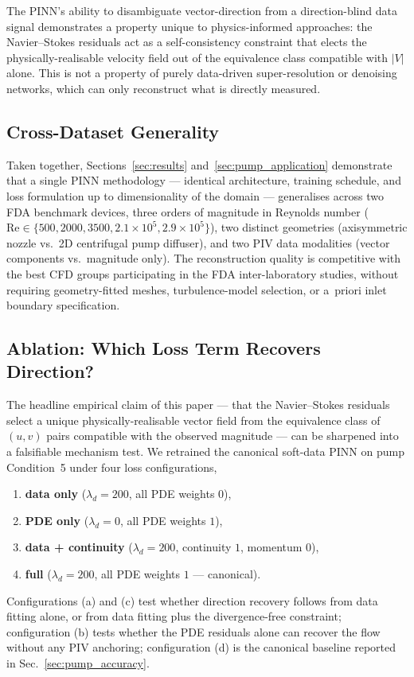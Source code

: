 \documentclass[12pt,a4paper]{article}
\newcommand{\Reyn}{\mathrm{Re}}    %
\begin{document}
The PINN's ability to disambiguate vector-direction from a
direction-blind data signal demonstrates a property unique to
physics-informed approaches: the Navier--Stokes residuals act
as a self-consistency constraint that elects the
physically-realisable velocity field out of the equivalence
class compatible with $|V|$ alone. This is not a property of
purely data-driven super-resolution or denoising networks,
which can only reconstruct what is directly measured.

\subsection{Cross-Dataset Generality}
\label{sec:pump_generality}

Taken together, Sections~\ref{sec:results}
and~\ref{sec:pump_application} demonstrate that a single PINN
methodology --- identical architecture, training schedule,
and loss formulation up to dimensionality of the domain ---
generalises across two FDA benchmark devices, three orders of
magnitude in Reynolds number ($\Reyn \in
\{500, 2000, 3500, 2.1 \times 10^5, 2.9 \times 10^5\}$), two
distinct geometries (axisymmetric nozzle vs.\ 2D centrifugal
pump diffuser), and two PIV data modalities (vector
components vs.\ magnitude only). The reconstruction quality
is competitive with the best CFD groups participating in the
FDA inter-laboratory studies, without requiring
geometry-fitted meshes, turbulence-model selection, or
a~priori inlet boundary specification.

\subsection{Ablation: Which Loss Term Recovers Direction?}
\label{sec:ablation_results}

The headline empirical claim of this paper --- that the
Navier--Stokes residuals select a unique physically-realisable
vector field from the equivalence class of $(u, v)$ pairs
compatible with the observed magnitude --- can be sharpened into
a falsifiable mechanism test. We retrained the canonical
soft-data PINN on pump Condition~5 under four loss
configurations,
\begin{enumerate}[label=(\alph*), leftmargin=*, itemsep=2pt]
  \item \textbf{data only} ($\lambda_d = 200$, all PDE weights $0$),
  \item \textbf{PDE only} ($\lambda_d = 0$, all PDE weights $1$),
  \item \textbf{data + continuity} ($\lambda_d = 200$, continuity $1$, momentum $0$),
  \item \textbf{full} ($\lambda_d = 200$, all PDE weights $1$ --- canonical).
\end{enumerate}
Configurations (a) and (c) test whether direction recovery
follows from data fitting alone, or from data fitting plus the
divergence-free constraint; configuration (b) tests whether the
PDE residuals alone can recover the flow without any PIV
anchoring; configuration (d) is the canonical baseline reported
in Sec.~\ref{sec:pump_accuracy}.
\end{document}
